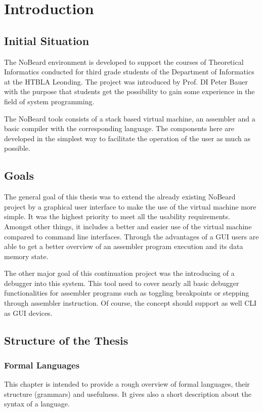 \chapter{Introduction}
\section{Initial Situation}
The NoBeard environment is developed to support the courses of Theoretical Informatics conducted for third grade students of the Department of Informatics at the HTBLA Leonding. The project was introduced by Prof. DI Peter Bauer with the purpose that students get the possibility to gain some experience in the field of system programming. 

The NoBeard tools consists of a stack based virtual machine, an assembler and a basic compiler with the corresponding language. The components here are developed in the simplest way  to facilitate the operation of the user as much as possible.

\section{Goals}
The general goal of this thesis was to extend the already existing NoBeard project by a graphical user interface to make the use of the virtual machine more simple. It was the highest priority to meet all the usability requirements. Amongst other things, it includes a better and easier use of the virtual machine compared to command line interfaces. Through the advantages of a GUI users are able to get a better overview of an assembler program execution and its data memory state.

The other major goal of this continuation project was the introducing of a debugger into this system. This tool need to cover nearly all basic debugger functionalities for assembler programs such as toggling breakpoints or stepping through assembler instruction. Of course, the concept should support as well CLI as GUI devices.

\section{Structure of the Thesis}
\subsection{Formal Languages}
This chapter is intended to provide a rough overview of formal languages, their structure (grammars) and usefulness. It gives also a short description about the syntax of a language.
